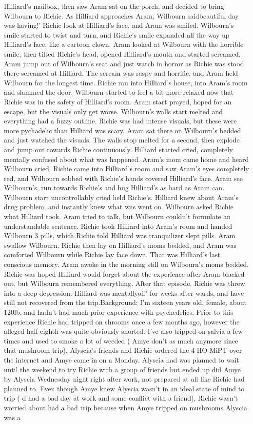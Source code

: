 \documentclass[12pt]{book}
\begin{document}
Hilliard's mailbox, then saw Aram sat on the porch, and decided to bring Wilbourn to Richie. As Hilliard approaches Aram, Wilbourn saidbeautiful day was having!' Richie look at Hilliard's face, and Aram was smiled. Wilbourn's smile started to twist and turn, and Richie's smile expanded all the way up Hilliard's face, like a cartoon clown. Aram looked at Wilbourn with the horrible smile, then tilted Richie's head, opened Hilliard's mouth and started screamed. Aram jump out of Wilbourn's seat and just watch in horror as Richie was stood there screamed at Hilliard. The scream was raspy and horrific, and Aram held Wilbourn for the longest time. Richie ran into Hilliard's house, into Aram's room and slammed the door. Wilbourn started to feel a bit more relaxed now that Richie was in the safety of Hilliard's room. Aram start prayed, hoped for an escape, but the visuals only get worse. Wilbourn's walls start melted and everything had a fuzzy outline. Richie was had intense visuals, but these were more pychadelic than Hilliard was scary. Aram sat there on Wilbourn's bedded and just watched the visuals. The walls stop melted for a second, then explode and jump out towards Richie continuously. Hilliard started cried, completely mentally confused about what was happened. Aram's mom came home and heard Wilbourn cried. Richie came into Hilliard's room and saw Aram's eyes completely red, and Wilbourn sobbed with Richie's hands covered Hilliard's face. Aram see Wilbourn's, run towards Richie's and hug Hilliard's as hard as Aram can. Wilbourn start uncontrollably cried held Richie's. Hilliard knew about Aram's drug problem, and instantly knew what was went on. Wilbourn asked Richie what Hilliard took. Aram tried to talk, but Wilbourn couldn't formulate an understandable sentence. Richie took Hilliard into Aram's room and handed Wilbourn 3 pills, which Richie told Hilliard was tranquilizer slept pills. Aram swallow Wilbourn. Richie then lay on Hilliard's moms bedded, and Aram was comforted Wilbourn while Richie lay face down. That was Hilliard's last conscious memory. Aram awoke in the morning still on Wilbourn's moms bedded. Richie was hoped Hilliard would forget about the experience after Aram blacked out, but Wilbourn remembered everything. After that episode, Richie was threw into a deep depression. Hilliard was mentallyoff' for weeks after wards, and have still not recovered from the trip.Background: I'm sixteen years old, female, about 120lb, and hadn't had much prior experience with psychedelics. Prior to this experience Richie had tripped on shrooms once a few months ago, however the alleged half eighth was quite obviously shorted. I've also tripped on salvia a few times and used to smoke a lot of weeded ( Amye don't as much anymore since that mushroom trip). Alyscia's friends and Richie ordered the 4-HO-MiPT over the internet and Amye came in on a Monday. Alyscia had was planned to wait until the weekend to try Richie with a group of friends but ended up did Amye by Alyscia Wednesday night right after work, not prepared at all like Richie had planned to. Even though Amye knew Alyscia wasn't in an ideal state of mind to trip ( d had a bad day at work and some conflict with a friend), Richie wasn't worried about had a bad trip because when Amye tripped on mushrooms Alyscia was a 
\end{document}
